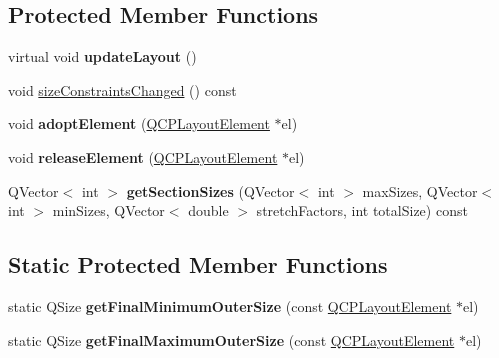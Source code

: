 \subsection*{Protected Member Functions}
\begin{DoxyCompactItemize}
\item 
virtual void {\bfseries update\+Layout} ()\hypertarget{classQCPLayout_a165c77f6287ac92e8d03017ad913378b}{}\label{classQCPLayout_a165c77f6287ac92e8d03017ad913378b}

\item 
void \hyperlink{classQCPLayout_a6218cd7e5c0e30077c1aeaffe55b6145}{size\+Constraints\+Changed} () const 
\item 
void {\bfseries adopt\+Element} (\hyperlink{classQCPLayoutElement}{Q\+C\+P\+Layout\+Element} $\ast$el)\hypertarget{classQCPLayout_af6dbbc24156a808da29cd1ec031729a3}{}\label{classQCPLayout_af6dbbc24156a808da29cd1ec031729a3}

\item 
void {\bfseries release\+Element} (\hyperlink{classQCPLayoutElement}{Q\+C\+P\+Layout\+Element} $\ast$el)\hypertarget{classQCPLayout_a4afbb4bef0071f72f91afdac4433a18e}{}\label{classQCPLayout_a4afbb4bef0071f72f91afdac4433a18e}

\item 
Q\+Vector$<$ int $>$ {\bfseries get\+Section\+Sizes} (Q\+Vector$<$ int $>$ max\+Sizes, Q\+Vector$<$ int $>$ min\+Sizes, Q\+Vector$<$ double $>$ stretch\+Factors, int total\+Size) const \hypertarget{classQCPLayout_a92d9dcd95e9510b323706ef7fc4ff62e}{}\label{classQCPLayout_a92d9dcd95e9510b323706ef7fc4ff62e}

\end{DoxyCompactItemize}
\subsection*{Static Protected Member Functions}
\begin{DoxyCompactItemize}
\item 
static Q\+Size {\bfseries get\+Final\+Minimum\+Outer\+Size} (const \hyperlink{classQCPLayoutElement}{Q\+C\+P\+Layout\+Element} $\ast$el)\hypertarget{classQCPLayout_a864fddc84721f186663faf3683f1fa70}{}\label{classQCPLayout_a864fddc84721f186663faf3683f1fa70}

\item 
static Q\+Size {\bfseries get\+Final\+Maximum\+Outer\+Size} (const \hyperlink{classQCPLayoutElement}{Q\+C\+P\+Layout\+Element} $\ast$el)\hypertarget{classQCPLayout_add49fd6843821a6126914b837ed52e22}{}\label{classQCPLayout_add49fd6843821a6126914b837ed52e22}

\end{DoxyCompactItemize}
